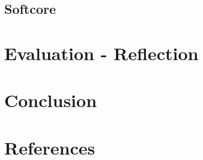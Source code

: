 \documentclass[12p]{article}
\begin{document}
\subsection{Softcore}
\label{Design:Softcore}





\newpage
\section{Evaluation - Reflection}
\label{Evaluation-Reflection}




\section{Conclusion}
\label{Conclusion}







\newpage
\section*{References}
\end{document}
